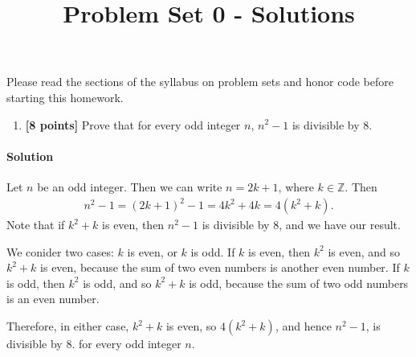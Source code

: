 \documentclass[11pt]{article}
\title{Problem Set 0 - Solutions}
\author{}
\date{}
\begin{document}
\maketitle

Please read the sections of the syllabus on problem sets and honor code before starting this homework.


\begin{enumerate}
\item  \textbf{[8 points]} Prove that for every odd integer $n$, $n^2-1$ is divisible by 8. 

\end{enumerate}

{\paragraph{Solution} Let $n$ be an odd integer. Then we can write $n=2k+1$, where $k\in \mathbb{Z}.$ Then
\begin{align}
n^2-1=(2k+1)^2-1=4k^2+4k=4(k^2+k).
\end{align}
Note that if $k^2+k$ is even, then $n^2-1$ is divisible by $8$, and we have our result.

We conider two cases: $k$ is even, or $k$ is odd. If $k$ is even, then $k^2$ is even, and so $k^2+k$ is even, because the sum of two even numbers is another even number. If $k$ is odd, then $k^2$ is odd, and so $k^2+k$ is odd, because the sum of two odd numbers is an even number.

Therefore, in either case, $k^2+k$ is even, so $4(k^2+k)$, and hence $n^2-1$, is divisible by $8.$ for every odd integer $n$.}
\end{document}
